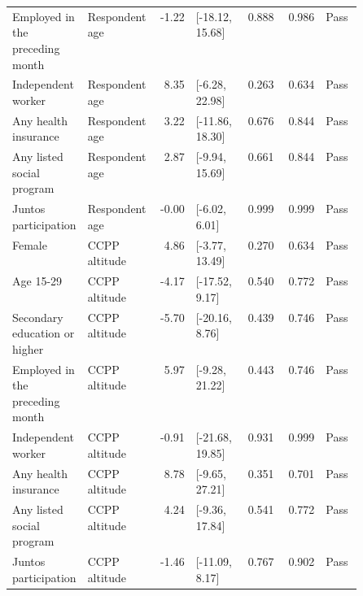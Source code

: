 \begin{longtable}{@{}p{0.20\linewidth}p{0.16\linewidth}rp{0.14\linewidth}rrl@{}}
Employed in the preceding month & Respondent age & -1.22 & [-18.12, 15.68] & 0.888 & 0.986 & Pass \\
Independent worker & Respondent age & 8.35 & [-6.28, 22.98] & 0.263 & 0.634 & Pass \\
Any health insurance & Respondent age & 3.22 & [-11.86, 18.30] & 0.676 & 0.844 & Pass \\
Any listed social program & Respondent age & 2.87 & [-9.94, 15.69] & 0.661 & 0.844 & Pass \\
Juntos participation & Respondent age & -0.00 & [-6.02, 6.01] & 0.999 & 0.999 & Pass \\
Female & CCPP altitude & 4.86 & [-3.77, 13.49] & 0.270 & 0.634 & Pass \\
Age 15-29 & CCPP altitude & -4.17 & [-17.52, 9.17] & 0.540 & 0.772 & Pass \\
Secondary education or higher & CCPP altitude & -5.70 & [-20.16, 8.76] & 0.439 & 0.746 & Pass \\
Employed in the preceding month & CCPP altitude & 5.97 & [-9.28, 21.22] & 0.443 & 0.746 & Pass \\
Independent worker & CCPP altitude & -0.91 & [-21.68, 19.85] & 0.931 & 0.999 & Pass \\
Any health insurance & CCPP altitude & 8.78 & [-9.65, 27.21] & 0.351 & 0.701 & Pass \\
Any listed social program & CCPP altitude & 4.24 & [-9.36, 17.84] & 0.541 & 0.772 & Pass \\
Juntos participation & CCPP altitude & -1.46 & [-11.09, 8.17] & 0.767 & 0.902 & Pass \\
\end{longtable}
\endgroup
